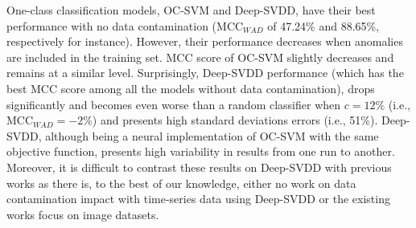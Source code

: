 One-class classification models, OC-SVM and Deep-SVDD, have their best performance with no data contamination (MCC$_{WAD}$ of 47.24\% and 88.65\%, respectively for instance). However, their performance decreases when anomalies are included in the training set. MCC score of OC-SVM slightly decreases and remains at a similar level. Surprisingly, Deep-SVDD performance (which has the best MCC score among all the models without data contamination), drops significantly and becomes even worse than a random classifier when $c=12\%$ (i.e., MCC$_{WAD} =-2\%$) and presents high standard deviations errors (i.e., 51\%). 
Deep-SVDD, although being a neural implementation of OC-SVM with the same objective function, presents high variability in results from one run to another. Moreover, it is difficult to contrast these results on Deep-SVDD with previous works as there is, to the best of our knowledge, either no work on data contamination impact with time-series data using Deep-SVDD or the existing works focus on image datasets. %


